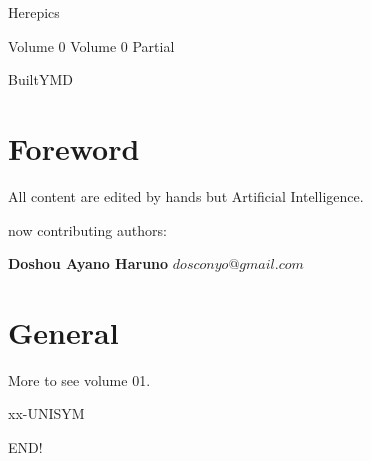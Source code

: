 
\author{dosconio}
\begin{center}
	\sc\fontsize{48pt}{0}\selectfont\textcolor[rgb]{1, 0, 0.618}{Herepics}
\end{center}
\ifdetail
{\hfill\sc\fontsize{24pt}{0}\selectfont\textcolor[rgb]{1, 0, 0.618}{Volume 0}}
\else
{\hfill\sc\fontsize{24pt}{0}\selectfont\textcolor[rgb]{1, 0, 0.618}{Volume 0} Partial}
\fi

{\hfill\sc\fontsize{24pt}{0}\selectfont\textcolor[rgb]{1, 0, 0.618}{BuiltY\number\year M\number\month D\number\day}}

\newpage %
\renewcommand{\contentsname}{Contents}
\tableofcontents

\section{Foreword} %

All content\cite{HEREPIC} are edited by hands but Artificial Intelligence.

now contributing authors:

\textbf{Doshou Ayano Haruno}
$dosconyo@gmail.com$

\section{General}


	

	More to see volume 01.

	

	

	

	

	

	

	

	

	

	

	

	{xx-UNISYM}

	

	

\newpage

\nocite{*}

END!
